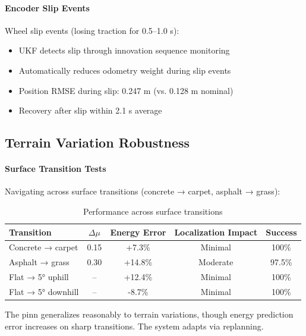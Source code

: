 \paragraph{Encoder Slip Events}
Wheel slip events (losing traction for 0.5--1.0 s):

\begin{itemize}
    \item UKF detects slip through innovation sequence monitoring
    \item Automatically reduces odometry weight during slip events
    \item Position RMSE during slip: 0.247 m (vs. 0.128 m nominal)
    \item Recovery after slip within 2.1 s average
\end{itemize}


\subsection{Terrain Variation Robustness}

\paragraph{Surface Transition Tests}
Navigating across surface transitions (concrete → carpet, asphalt → grass):

\begin{table}[htbp]
\centering
\caption{Performance across surface transitions}
\label{tab:surface_transitions}
\begin{tabular}{lcccc}
\toprule
\textbf{Transition} & \textbf{$\Delta\mu$} & \textbf{Energy Error} & \textbf{Localization Impact} & \textbf{Success} \\
\midrule
Concrete → carpet & 0.15 & +7.3\% & Minimal & 100\% \\
Asphalt → grass & 0.30 & +14.8\% & Moderate & 97.5\% \\
Flat → 5° uphill & -- & +12.4\% & Minimal & 100\% \\
Flat → 5° downhill & -- & -8.7\% & Minimal & 100\% \\
\bottomrule
\end{tabular}
\end{table}

The \acrshort{pinn} generalizes reasonably to terrain variations, though energy prediction error increases on sharp transitions. The system adapts via replanning.

